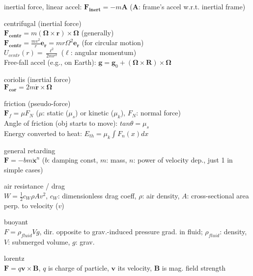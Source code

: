 \documentclass[letterpaper,landscape,10pt]{article}
\newenvironment{mydescription}
{\begin{description}
	\setlength{\itemsep}{0pt}
	\setlength{\parskip}{0pt}
	\setlength{\parsep}{-1pt}}
{\end{description}}
\begin{document}
{\begin{multicols}{3}
\begin{mydescription}
		\item[inertial force, linear accel:] $\bm{F_{inert}}=-m\bm{A}$
			($\bm{A}$: frame's accel w.r.t. inertial frame)
		\item[centrifugal] (inertial force) \\
		  $\bm{F_{centr}}=m\left( \bm{\Omega}\times\bm{r}
		  \right)\times\bm{\Omega}$ (generally)\\
		  $\bm{F_{centr}} = \frac{mv^2}{r}\bm{e_r} =
		   mr\Omega^2\bm{e_r}$ (for circular motion)\\
		  $U_{centr}(r) = \frac{\ell^2}{2mr^2}$ ($\ell$: angular momentum)\\
		  Free-fall accel (e.g., on Earth): $\bm{g}=\bm{g}_0+\left(
		  \bm{\Omega\times\bm{R}} \right)\times\bm{\Omega}$

		\item[coriolis] (inertial force)\\
		  $\bm{F_{cor}}=2m\dot{\bm{r}}\times \bm{\Omega}$

		\item[friction] (pseudo-force) \\
			$\bm{F}_f = \mu F_N$ ($\mu$: static ($\mu_s$) or
			kinetic ($\mu_k$), $F_N$: normal force)\\
			Angle of friction (obj starts to move): $tan \theta = \mu_s$\\
			Energy converted to heat: $E_{th} = \mu_k \int F_n(x)dx$

		\item[general retarding] \  \\
			$\bm{F} = -bm\dot{\bm{x}}^n$ ($b$: damping const,
			$m$: mass, $n$: power of velocity dep., just 1 in simple cases)  \\

		\item[air resistance / drag] \  \\
			$W=\frac{1}{2}c_W\rho Av^2$,
			$c_W$: dimensionless drag coeff, $\rho$: air density,
			$A$: cross-sectional area perp. to velocity ($v$) \\

		\item[buoyant] \  \\
			$F = \rho_{fluid}Vg$, dir. opposite to grav.-induced pressure grad.
			in fluid; $\rho_{fluid}$: density, $V$: submerged volume,
			$g$: grav. \\

		\item[lorentz] \  \\
			$\bm{F} = q\bm{v}\times\bm{B}$,
			$q$ is charge of particle, $\bm{v}$ its velocity,
			$\bm{B}$ is mag. field strength  \\


\end{mydescription}
\end{multicols}}
\end{document}
